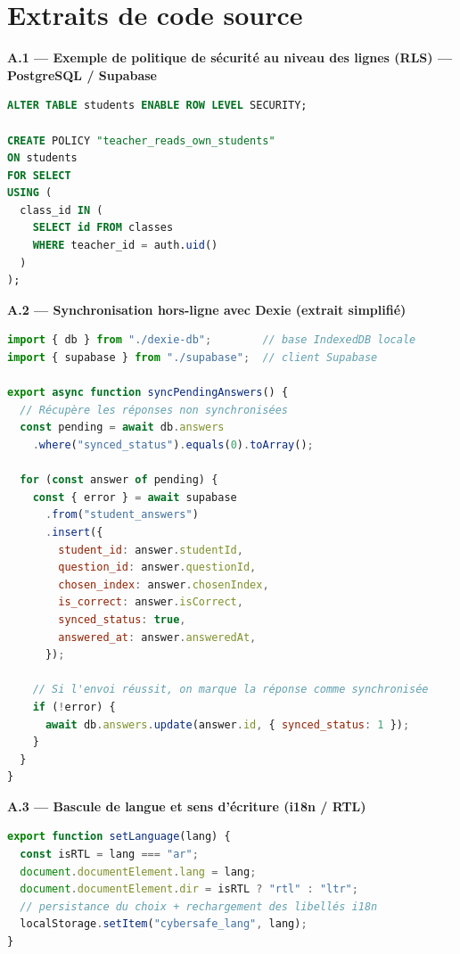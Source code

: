 \documentclass[12pt, a4paper, oneside]{report}
\begin{document}
\renewcommand{\chaptername}{Annexe}
\appendix
{}

\chapter{Extraits de code source}
\label{ann:code}

\textbf{A.1 — Exemple de politique de sécurité au niveau des lignes (RLS) — PostgreSQL / Supabase}
\begin{lstlisting}[language=SQL, caption={Politique RLS : un enseignant n'accède qu'aux élèves de ses classes}]
ALTER TABLE students ENABLE ROW LEVEL SECURITY;

CREATE POLICY "teacher_reads_own_students"
ON students
FOR SELECT
USING (
  class_id IN (
    SELECT id FROM classes
    WHERE teacher_id = auth.uid()
  )
);
\end{lstlisting}

\textbf{A.2 — Synchronisation hors-ligne avec Dexie (extrait simplifié)}
\begin{lstlisting}[language=JavaScript, caption={Pousse des réponses en attente vers Supabase à la reconnexion}]
import { db } from "./dexie-db";        // base IndexedDB locale
import { supabase } from "./supabase";  // client Supabase

export async function syncPendingAnswers() {
  // Récupère les réponses non synchronisées
  const pending = await db.answers
    .where("synced_status").equals(0).toArray();

  for (const answer of pending) {
    const { error } = await supabase
      .from("student_answers")
      .insert({
        student_id: answer.studentId,
        question_id: answer.questionId,
        chosen_index: answer.chosenIndex,
        is_correct: answer.isCorrect,
        synced_status: true,
        answered_at: answer.answeredAt,
      });

    // Si l'envoi réussit, on marque la réponse comme synchronisée
    if (!error) {
      await db.answers.update(answer.id, { synced_status: 1 });
    }
  }
}
\end{lstlisting}

\textbf{A.3 — Bascule de langue et sens d'écriture (i18n / RTL)}
\begin{lstlisting}[language=JavaScript, caption={Application de la direction RTL lors du passage à l'arabe}]
export function setLanguage(lang) {
  const isRTL = lang === "ar";
  document.documentElement.lang = lang;
  document.documentElement.dir = isRTL ? "rtl" : "ltr";
  // persistance du choix + rechargement des libellés i18n
  localStorage.setItem("cybersafe_lang", lang);
}
\end{lstlisting}
\end{document}
